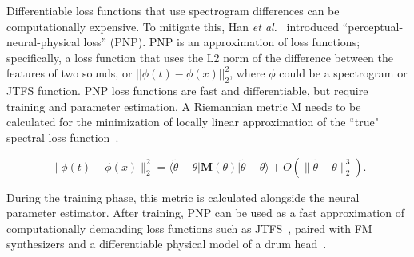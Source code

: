 \documentclass[lettersize,journal]{IEEEtran}
\begin{document}


Differentiable loss functions that use spectrogram differences can be computationally expensive. To mitigate this, Han \textit{et al.}~\cite{han2023perceptual} introduced ``perceptual-neural-physical loss'' (PNP). PNP is an approximation of loss functions; specifically, a loss function that uses the L2 norm of the difference between the features of two sounds, or $||\phi(t) - \phi(x)||^2_2$, where $\phi$ could be a spectrogram or JTFS function. PNP loss functions are fast and differentiable, but require training and parameter estimation. A Riemannian metric M needs to be calculated for the minimization of locally linear approximation of the ``true" spectral loss function~\cite{han2023perceptual}. 


\[
\|\phi(t) - \phi(x)\|_2^2 = \langle \tilde{\theta} - \theta | \mathbf{M}(\theta) | \tilde{\theta} - \theta \rangle + O(\|\tilde{\theta} - \theta\|_2^3). \tag{4}
\]

During the training phase, this metric is calculated alongside the neural parameter estimator. After training, PNP can be used as a fast approximation of computationally demanding loss functions such as JTFS~\cite{han2023perceptual,han2024learning}, paired with FM synthesizers and a differentiable physical model of a drum head~\cite{smith2010physical}.
\end{document}
